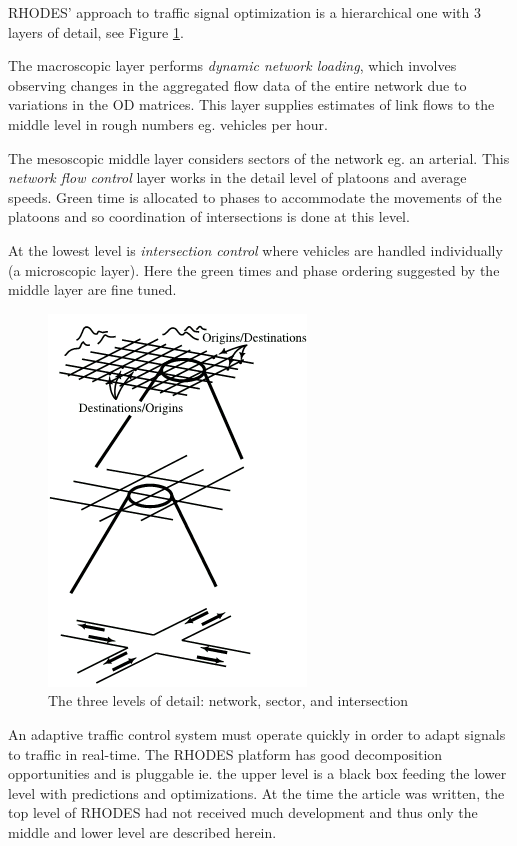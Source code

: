 \label{sec:rhodes}

RHODES' approach to traffic signal optimization is a hierarchical one
with 3 layers of detail, see Figure \ref{fig:rhodes_hierarchi}.

The macroscopic layer performs \textit{dynamic network loading}, which
involves observing changes in the aggregated flow data of the entire
network due to variations in the OD matrices. This layer supplies
estimates of link flows to the middle level in rough numbers
eg. vehicles per hour.

The mesoscopic middle layer considers sectors of the network eg. an
arterial. This \textit{network flow control} layer works in the detail
level of platoons and average speeds. Green time is allocated to
phases to accommodate the movements of the platoons and so
coordination of intersections is done at this level.

At the lowest level is \textit{intersection control} where vehicles
are handled individually (a microscopic layer). Here the green times
and phase ordering suggested by the middle layer are fine tuned.

\begin{figure}[!ht]
\begin{center}
\includegraphics[scale=0.5]{rhodes_hierachy.png} 
\end{center}
\caption{The three levels of detail: network, sector, and intersection}
\label{fig:rhodes_hierarchi}
\end{figure}

An adaptive traffic control system must operate quickly in order to
adapt signals to traffic in real-time. The RHODES platform has good
decomposition opportunities and is pluggable ie. the upper level is a
black box feeding the lower level with predictions and
optimizations. At the time the article was written, the top level of
RHODES had not received much development and thus only the middle and
lower level are described herein.

